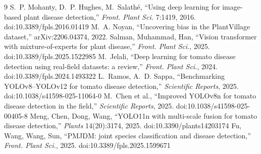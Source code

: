 \documentclass[11pt,a4paper]{article}
\begin{document}
\begin{thebibliography}{9}
\footnotesize
{} S.~P. Mohanty, D.~P. Hughes, M.~Salath\'e, ``Using deep learning for image-based plant disease detection,'' \emph{Front. Plant Sci.} 7:1419, 2016. doi:10.3389/fpls.2016.01419
 M.~A. Noyan, ``Uncovering bias in the PlantVillage dataset,'' arXiv:2206.04374, 2022.
 Salman, Muhammad, Han, ``Vision transformer with mixture-of-experts for plant disease,'' \emph{Front. Plant Sci.}, 2025. doi:10.3389/fpls.2025.1522985
 M.~Jelali, ``Deep learning for tomato disease detection using real-field datasets: a review,'' \emph{Front. Plant Sci.}, 2024. doi:10.3389/fpls.2024.1493322
 L.~Ramos, A.~D. Sappa, ``Benchmarking YOLOv8--YOLOv12 for tomato disease detection,'' \emph{Scientific Reports}, 2025. doi:10.1038/s41598-025-11064-0
 M.~Chen et al., ``Improved YOLOv8n for tomato disease detection in the field,'' \emph{Scientific Reports}, 2025. doi:10.1038/s41598-025-00405-8
 Meng, Chen, Dong, Wang, ``YOLO11n with multi-scale fusion for tomato disease detection,'' \emph{Plants} 14(20):3174, 2025. doi:10.3390/plants14203174
 Fu, Wang, Wang, Sun, ``PMJDM: joint species classification and disease detection,'' \emph{Front. Plant Sci.}, 2025. doi:10.3389/fpls.2025.1599671
\end{thebibliography}
\end{document}
